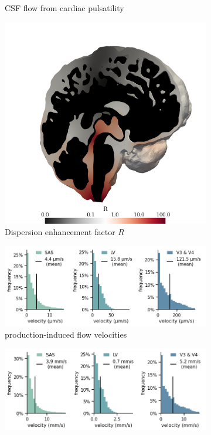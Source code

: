 \documentclass[fleqn,10pt]{wlscirep}
\begin{document}
\begin{figure}[h!]
\begin{subfigure}[b]{0.33\textwidth}
\caption{CSF flow  from cardiac pulsatility}
\label{fig:csf_flow_cardiac}
\end{subfigure}
\begin{subfigure}[b]{0.33\textwidth}
\includegraphics[width = 1 \textwidth]{figures/R.png} 
\caption{Dispersion enhancement factor $R$}
\label{fig:csf_flow_R}
\end{subfigure}
\begin{subfigure}[b]{0.33\textwidth}
\includegraphics[width = 1 \textwidth]{figures/prod_velocity_histo.png} 
\caption{production-induced flow velocities}
\label{fig:csf_flow_histo_prod}
\end{subfigure}
\begin{subfigure}[b]{0.33\textwidth}
\includegraphics[width = 1 \textwidth]{figures/cardiac_velocity_histo.png} 

\end{subfigure}
\end{figure}
\end{document}
